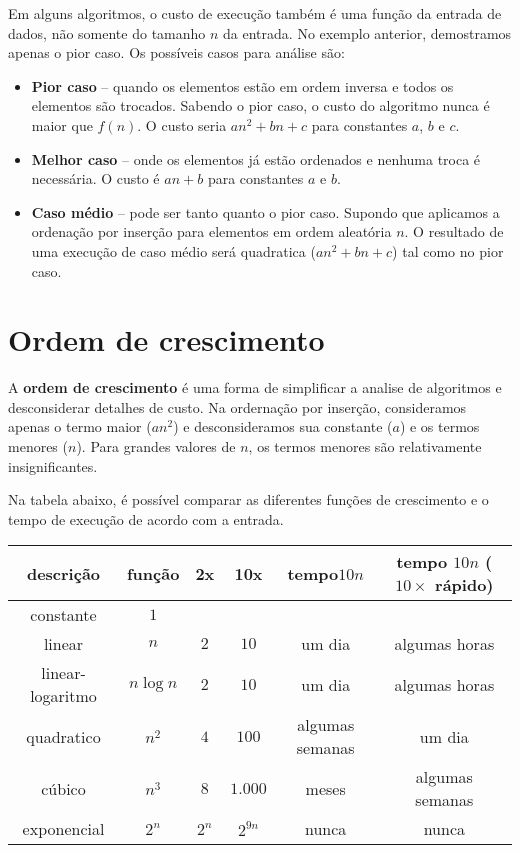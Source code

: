 Em alguns algoritmos, o custo de execução também é uma função da entrada de dados, não somente
do tamanho $n$ da entrada.
No exemplo anterior, demostramos apenas o pior caso. 
Os possíveis casos para análise são:
\begin{itemize}
\item {\bf Pior caso} -- quando os elementos estão em ordem inversa e todos os elementos 
são trocados.
Sabendo o pior caso, o custo do algoritmo nunca é maior que $f(n)$.
O custo seria $an^2 + bn +c$ para constantes $a$, $b$ e $c$.

\item {\bf Melhor caso} -- onde os elementos já estão ordenados e nenhuma troca é necessária.
O custo é $an + b$ para constantes $a$ e $b$.

\item {\bf Caso médio} -- pode ser tanto quanto o pior caso. Supondo que aplicamos 
a ordenação por inserção para elementos em ordem aleatória $n$. 
O resultado de uma execução de caso médio será quadratica ($an^2 + bn +c$)
tal como no pior caso.
\end{itemize}


\section{Ordem de crescimento}

A {\bf ordem de crescimento} é uma forma de simplificar a analise de algoritmos
e desconsiderar detalhes de custo.
Na ordernação por inserção, consideramos apenas o termo maior ($an^2$) e desconsideramos
sua constante ($a$) e os termos menores ($n$). 
Para grandes valores de $n$, os termos menores são relativamente insignificantes.

Na tabela abaixo, é possível comparar as diferentes funções de crescimento e 
o tempo de execução de acordo com a entrada.
\begin{table}[ht]
\centering
\begin{tabular}{cccccc}
\hline
{\bf descrição} & {\bf função} & {\bf 2x} & {\bf 10x} & {\bf tempo$10n$} & {\bf tempo $10n$ ($10\times$ rápido)} \\ 
\hline
constante        & $1$ & & & &  \\
linear           & $n$        & $2$ & $10$ & um dia & algumas horas \\
linear-logaritmo & $n \log n$ & $2$ & $10$ & um dia & algumas horas \\
quadratico       & $n^2$      & $4$  & $100$ & algumas semanas & um dia  \\
cúbico           & $n^3$ & $8$ & $1.000$ & meses & algumas semanas  \\
exponencial      & $2^n$  & $2^n$ & $2^{9n}$ & nunca & nunca  \\
\hline
\end{tabular}
\end{table}

